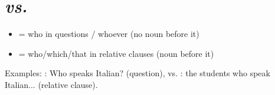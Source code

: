 \section{ \textit{vs.} }
\begin{itemize}[nosep]
    \item {} = who in questions / whoever (no noun before it)
    \item {} = who/which/that in relative clauses (noun before it)
\end{itemize}

Examples: : Who speaks Italian? (question), vs.
: the students who speak Italian... (relative clause).

